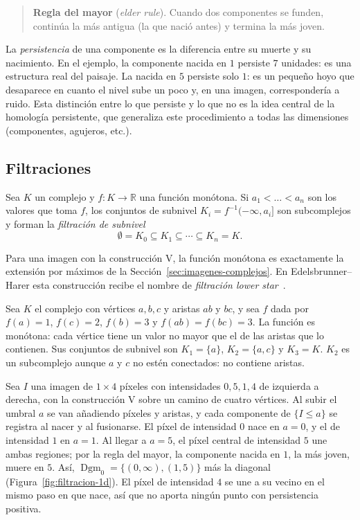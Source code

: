 \begin{quote}
\textbf{Regla del mayor} (\emph{elder rule}). Cuando dos componentes se
funden, continúa la más antigua (la que nació antes) y termina la más
joven.
\end{quote}

La \emph{persistencia} de una componente es la diferencia entre su muerte
y su nacimiento. En el ejemplo, la componente nacida en $1$ persiste $7$
unidades: es una estructura real del paisaje. La nacida en $5$ persiste
solo $1$: es un pequeño hoyo que desaparece en cuanto el nivel sube un
poco y, en una imagen, correspondería a ruido. Esta distinción entre lo
que persiste y lo que no es la idea central de la homología persistente,
que generaliza este procedimiento a todas las dimensiones (componentes,
agujeros, etc.).

\subsection{Filtraciones}

\begin{definicion}
Sea $K$ un complejo y $f:K\to\mathbb{R}$ una función monótona. Si
$a_1<\dots<a_n$ son los valores que toma $f$, los conjuntos de subnivel
$K_i=f^{-1}(-\infty,a_i]$ son subcomplejos y forman la \emph{filtración de
subnivel}
\[
  \emptyset=K_0\subseteq K_1\subseteq\cdots\subseteq K_n=K.
\]
\end{definicion}

Para una imagen con la construcción V, la función monótona es exactamente
la extensión por máximos de la Sección~\ref{sec:imagenes-complejos}. En
Edelsbrunner--Harer esta construcción recibe el nombre de \emph{filtración
lower star}~\cite[§VII.2]{edelsbrunner2010}.

\begin{ejemplo}
Sea $K$ el complejo con vértices $a,b,c$ y aristas $ab$ y $bc$, y sea $f$
dada por $f(a)=1$, $f(c)=2$, $f(b)=3$ y $f(ab)=f(bc)=3$. La función es
monótona: cada vértice tiene un valor no mayor que el de las aristas que lo
contienen. Sus conjuntos de subnivel son $K_1=\{a\}$, $K_2=\{a,c\}$ y
$K_3=K$. $K_2$ es un subcomplejo aunque $a$ y $c$ no estén conectados: no
contiene aristas.
\end{ejemplo}

\begin{ejemplo}
Sea $I$ una imagen de $1\times4$ píxeles con intensidades $0,5,1,4$ de
izquierda a derecha, con la construcción V sobre un camino de cuatro
vértices. Al subir el umbral $a$ se van añadiendo píxeles y aristas, y cada
componente de $\{I\le a\}$ se registra al nacer y al fusionarse. El píxel de
intensidad $0$ nace en $a=0$, y el de intensidad $1$ en $a=1$. Al llegar a
$a=5$, el píxel central de intensidad $5$ une ambas regiones; por la regla
del mayor, la componente nacida en $1$, la más joven, muere en $5$. Así,
$\operatorname{Dgm}_0=\{(0,\infty),(1,5)\}$ más la diagonal
(Figura~\ref{fig:filtracion-1d}). El píxel de intensidad $4$ se une a su
vecino en el mismo paso en que nace, así que no aporta ningún punto con
persistencia positiva.
\end{ejemplo}

